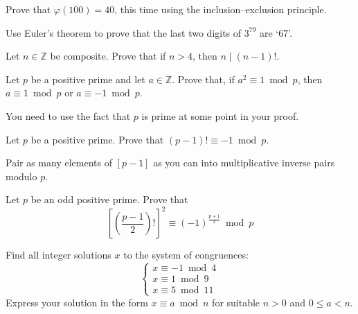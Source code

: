 \begin{exercise}
Prove that $\varphi(100)=40$, this time using the inclusion--exclusion principle.
\end{exercise}



\begin{exercise}
Use Euler's theorem to prove that the last two digits of $3^{79}$ are `$67$'.
\end{exercise}


\begin{exercise} \label{exCompositeDividesFactorial}
Let $n \in \mathbb{Z}$ be composite. Prove that if $n>4$, then $n \mid (n-1)!$.
\end{exercise}

\begin{exercise} \label{exSquareCongruentToOneModPrimeUnit}
Let $p$ be a positive prime and let $a \in \mathbb{Z}$. Prove that, if $a^2 \equiv 1 \bmod p$, then $a \equiv 1 \bmod p$ or $a \equiv {-1} \bmod p$. 
\begin{backhint}
You need to use the fact that $p$ is prime at some point in your proof.
\end{backhint}
\end{exercise}



\begin{exercise}
\label{exPrimeFactorialCongruentToMinusOne}
Let $p$ be a positive prime. Prove that $(p-1)! \equiv -1 \bmod p$.
\begin{backhint}
Pair as many elements of $[p-1]$ as you can into multiplicative inverse pairs modulo $p$.
\end{backhint}
\end{exercise}

\begin{exercise}
Let $p$ be an odd positive prime. Prove that
\[ \left[ \left( \frac{p-1}{2} \right)! \right]^2 \equiv (-1)^{\frac{p+1}{2}} \bmod p \]
\end{exercise}


\begin{exercise}
Find all integer solutions $x$ to the system of congruences:
\[ \begin{cases}
x \equiv {-1} \bmod 4 \\
x \equiv 1 \bmod 9 \\
x \equiv 5 \bmod{11}
\end{cases} \]
Express your solution in the form $x \equiv a \bmod n$ for suitable $n > 0$ and $0 \le a < n$.
\end{exercise}

